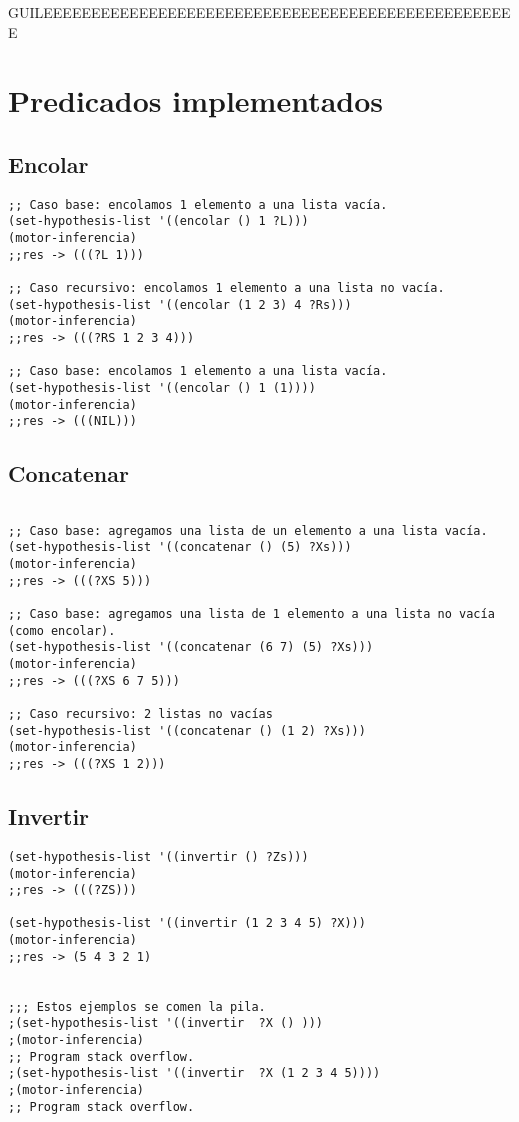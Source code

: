 \documentclass[nochap]{apuntes}
\begin{document}
GUILEEEEEEEEEEEEEEEEEEEEEEEEEEEEEEEEEEEEEEEEEEEEEEEEEE


\section{Predicados implementados}

\subsection*{Encolar}
\begin{lstlisting}
;; Caso base: encolamos 1 elemento a una lista vacía.
(set-hypothesis-list '((encolar () 1 ?L)))
(motor-inferencia)
;;res -> (((?L 1)))

;; Caso recursivo: encolamos 1 elemento a una lista no vacía.
(set-hypothesis-list '((encolar (1 2 3) 4 ?Rs)))
(motor-inferencia)
;;res -> (((?RS 1 2 3 4)))

;; Caso base: encolamos 1 elemento a una lista vacía.
(set-hypothesis-list '((encolar () 1 (1))))
(motor-inferencia)
;;res -> (((NIL)))
\end{lstlisting}

\subsection*{Concatenar}
\begin{lstlisting}

;; Caso base: agregamos una lista de un elemento a una lista vacía.
(set-hypothesis-list '((concatenar () (5) ?Xs)))
(motor-inferencia)
;;res -> (((?XS 5)))

;; Caso base: agregamos una lista de 1 elemento a una lista no vacía (como encolar).
(set-hypothesis-list '((concatenar (6 7) (5) ?Xs)))
(motor-inferencia)
;;res -> (((?XS 6 7 5)))

;; Caso recursivo: 2 listas no vacías
(set-hypothesis-list '((concatenar () (1 2) ?Xs)))
(motor-inferencia)
;;res -> (((?XS 1 2)))
\end{lstlisting}


\subsection*{Invertir}
\begin{lstlisting}
(set-hypothesis-list '((invertir () ?Zs)))
(motor-inferencia)
;;res -> (((?ZS)))

(set-hypothesis-list '((invertir (1 2 3 4 5) ?X)))
(motor-inferencia)
;;res -> (5 4 3 2 1)


;;; Estos ejemplos se comen la pila.
;(set-hypothesis-list '((invertir  ?X () )))
;(motor-inferencia)
;; Program stack overflow.
;(set-hypothesis-list '((invertir  ?X (1 2 3 4 5))))
;(motor-inferencia)
;; Program stack overflow.

\end{lstlisting}
\end{document}

